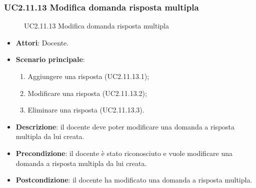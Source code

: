 \subsubsection{UC2.11.13 Modifica domanda risposta multipla}
\begin{figure}[H]
\centering
\noindent{}
\caption{UC2.11.13 Modifica domanda risposta multipla}
\end{figure}
\begin{itemize}
\item \textbf{Attori}: Docente.
\item \textbf{Scenario principale}:
\begin{enumerate}
\item Aggiungere una risposta (UC2.11.13.1);
\item Modificare una risposta (UC2.11.13.2);
\item Eliminare una risposta (UC2.11.13.3).
\end{enumerate}
\item \textbf{Descrizione}: il docente deve poter modificare una domanda a risposta multipla da lui creata.
\item \textbf{Precondizione}: il docente è stato riconosciuto e vuole modificare una domanda a risposta multipla da lui creata.
\item \textbf{Postcondizione}: il docente ha modificato una domanda a risposta multipla.
\end{itemize}
